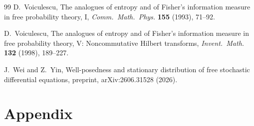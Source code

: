 \documentclass[11pt]{article}
\theoremstyle{plain}
\theoremstyle{definition}
\theoremstyle{remark}
\begin{document}
\begin{singlespace}
\begin{thebibliography}{99}
D.~Voiculescu,
The analogues of entropy and of Fisher's information measure in free probability
theory, I, \emph{Comm.\ Math.\ Phys.} \textbf{155} (1993), 71--92.

D.~Voiculescu,
The analogues of entropy and of Fisher's information measure in free probability
theory, V: Noncommutative Hilbert transforms,
\emph{Invent.\ Math.} \textbf{132} (1998), 189--227.

J.~Wei and Z.~Yin,
Well-posedness and stationary distribution of free stochastic differential equations,
preprint, arXiv:2606.31528 (2026).

\end{thebibliography}
\end{singlespace}

\newpage
\appendix

\section*{Appendix}
\end{document}
